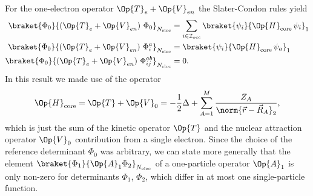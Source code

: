 \begin{rem}
	For the one-electron operator $\Op{T}_e + \Op{V}_{en}$
	the Slater-Condon rules yield
	\begin{equation}
		\begin{aligned}
		\braket{\Phi_0}{\left(\Op{T}_e + \Op{V}_{en}\right) \,\Phi_0}_{\Nelec}
		&= \sum_{i\in\Iocc} \braket{\psi_i}{\Op{H}_{\text{core}} \, \psi_i}_1 \\
		\braket{\Phi_0}{\left(\Op{T}_e + \Op{V}_{en}\right) \,\Phi_{i}^{a}}_{\Nelec}
		&= \braket{\psi_i}{\Op{H}_\text{core} \, \psi_a}_1 \\
		\braket{\Phi_0}{\left(\Op{T}_e + \Op{V}_{en}\right) \,\Phi_{ij}^{ab}}_{\Nelec}
		&= 0.
		\label{eqn:SlaterCondonHcore}
		\end{aligned}
	\end{equation}
	In this result we made use of the  operator
	\begin{equation}
		\Op{H}_\text{core}
		= \Op{T} + \Op{V}_0
		= -\frac12 \Delta + \sum_{A=1}^M \frac{Z_A}{\norm{\vec{r} - \vec{R}_A}_2},
		\label{eqn:HCore}
	\end{equation}
	which is just the sum of the kinetic operator $\Op{T}$
	and the nuclear attraction operator $\Op{V}_0$
	contribution from a single electron.
	Since the choice of the reference determinant $\Phi_0$
	was arbitrary, we can state more generally that the element
	$\braket{\Phi_1}{\Op{A}_1 \Phi_2}_{\Nelec}$
	of a one-particle operator $\Op{A}_1$
	is only non-zero for determinants $\Phi_1$, $\Phi_2$,
	which differ in at most one single-particle function.


\end{rem}
